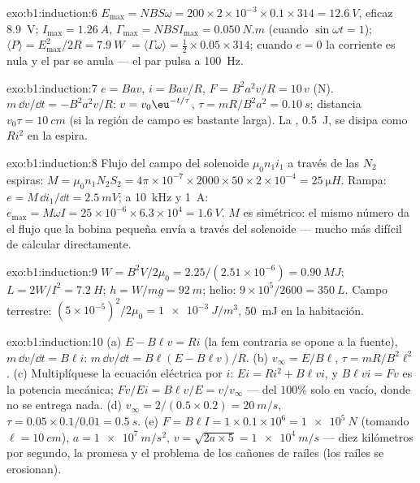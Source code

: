 \begin{solution}{exo:b1:induction:6}
$E_{\max} = NBS\omega = 200 \times 2 \times 10^{-3} \times 0.1 \times 314 = \qty{12.6}{V}$, eficaz
\qty{8.9}{V}; $I_{\max} = \qty{1.26}{A}$, $\Gamma_{\max} = NBSI_{\max} = \qty{0.050}{N.m}$
(cuando $\sin\omega t = 1$); $\langle P\rangle = E_{\max}^2/2R = \qty{7.9}{W}$ $=
\langle\Gamma\omega\rangle = \tfrac12 \times 0.05 \times 314$; cuando $e = 0$ la corriente es
nula y el par se anula --- el par pulsa a \qty{100}{Hz}.
\end{solution}

\begin{solution}{exo:b1:induction:7}
$e = Bav$, $i = Bav/R$, $F = B^2a^2v/R = 10\,v$ (N). $m\,\dd v/\dd t = -B^2a^2v/R$:
$v = v_0\eu^{-t/\tau}$, $\tau = mR/B^2a^2 = \qty{0.10}{s}$; distancia $v_0\tau =
\qty{10}{cm}$ (si la región de campo es bastante larga). La ,
\qty{0.5}{J}, se disipa como $Ri^2$ en la espira.
\end{solution}

\begin{solution}{exo:b1:induction:8}
Flujo del campo del solenoide $\mu_0n_1i_1$ a través de las $N_2$ espiras: $M =
\mu_0n_1N_2S_2 = 4\pi \times 10^{-7} \times 2000 \times 50 \times 2 \times 10^{-4} = \qty{25}{\micro H}$.
Rampa: $e = M\,\dd i_1/\dd t = \qty{2.5}{mV}$; a \qty{10}{kHz} y \qty{1}{A}: $e_{\max} =
M\omega I = 25 \times 10^{-6} \times 6.3 \times 10^4 = \qty{1.6}{V}$. $M$ es simétrico:
el mismo número da el flujo que la bobina pequeña envía a través del
solenoide --- mucho más difícil de calcular directamente.
\end{solution}

\begin{solution}{exo:b1:induction:9}
$W = B^2V/2\mu_0 = 2.25/(2.51 \times 10^{-6}) = \qty{0.90}{MJ}$; $L = 2W/I^2 =
\qty{7.2}{H}$; $h = W/mg = \qty{92}{m}$; helio: $9 \times 10^5/2600 = \qty{350}{L}$.
Campo terrestre: $(5 \times 10^{-5})^2/2\mu_0 = \qty{1e-3}{J/m^3}$, \qty{50}{mJ} en
la habitación.
\end{solution}

\begin{solution}{exo:b1:induction:10}
(a) $E - B\ell v = Ri$ (la fem contraria se opone a la fuente), $m\,\dd v/\dd t =
B\ell i$: $m\,\dd v/\dd t = B\ell(E - B\ell v)/R$. (b) $v_\infty = E/B\ell$, $\tau =
mR/B^2\ell^2$. (c) Multiplíquese la ecuación eléctrica por $i$: $Ei = Ri^2 +
B\ell vi$, y $B\ell vi = Fv$ es la potencia mecánica;  $Fv/Ei =
B\ell v/E = v/v_\infty$ --- del $100\%$ solo en vacío, donde no se entrega
nada. (d) $v_\infty = 2/(0.5 \times 0.2) = \qty{20}{m/s}$, $\tau = 0.05 \times
0.1/0.01 = \qty{0.5}{s}$. (e) $F = B\ell I = 1 \times 0.1 \times 10^6 = \qty{1e5}{N}$
(tomando $\ell = \qty{10}{cm}$), $a = \qty{1e7}{m/s^2}$, $v = \sqrt{2a \times 5} =
\qty{1e4}{m/s}$ --- diez kilómetros por segundo, la promesa y el
problema de los cañones de raíles (los raíles se erosionan).
\end{solution}

